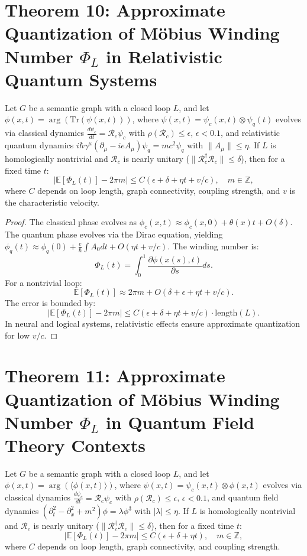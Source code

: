 \documentclass[12pt]{article}
\begin{document}
\section*{Theorem 10: Approximate Quantization of Möbius Winding Number \(\Phi_L\) in Relativistic Quantum Systems}
\begin{theorem}
Let \(G\) be a semantic graph with a closed loop \(L\), and let \(\phi(x,t) = \arg(\text{Tr}(\psi(x,t)))\), where \(\psi(x,t) = \psi_c(x,t) \otimes \psi_q(t)\) evolves via classical dynamics \(\frac{d\psi_c}{dt} = \mathcal{R}_c \psi_c\) with \(\rho(\mathcal{R}_c) \leq \epsilon\), \(\epsilon < 0.1\), and relativistic quantum dynamics \(i \hbar \gamma^\mu (\partial_\mu - ie A_\mu) \psi_q = m c^2 \psi_q\) with \(\|A_\mu\| \leq \eta\). If \(L\) is homologically nontrivial and \(\mathcal{R}_c\) is nearly unitary (\(\|\mathcal{R}_c^\dagger \mathcal{R}_c\| \leq \delta\)), then for a fixed time \(t\):
\[
\left| \mathbb{E}[\Phi_L(t)] - 2\pi m \right| \leq C (\epsilon + \delta + \eta t + v/c), \quad m \in \mathbb{Z},
\]
where \(C\) depends on loop length, graph connectivity, coupling strength, and \(v\) is the characteristic velocity.
\end{theorem}

\begin{proof}
The classical phase evolves as \(\phi_c(x,t) \approx \phi_c(x,0) + \theta(x)t + O(\delta)\). The quantum phase evolves via the Dirac equation, yielding \(\phi_q(t) \approx \phi_q(0) + \frac{e}{\hbar} \int A_0 dt + O(\eta t + v/c)\). The winding number is:
\[
\Phi_L(t) = \int_0^1 \frac{\partial \phi(x(s),t)}{\partial s} ds.
\]
For a nontrivial loop:
\[
\mathbb{E}[\Phi_L(t)] \approx 2\pi m + O(\delta + \epsilon + \eta t + v/c).
\]
The error is bounded by:
\[
\left| \mathbb{E}[\Phi_L(t)] - 2\pi m \right| \leq C (\epsilon + \delta + \eta t + v/c) \cdot \text{length}(L).
\]
In neural and logical systems, relativistic effects ensure approximate quantization for low \(v/c\).
\end{proof}
\section*{Theorem 11: Approximate Quantization of Möbius Winding Number \(\Phi_L\) in Quantum Field Theory Contexts}
\begin{theorem}
Let \(G\) be a semantic graph with a closed loop \(L\), and let \(\phi(x,t) = \arg(\langle \phi(x,t) \rangle)\), where \(\psi(x,t) = \psi_c(x,t) \otimes \phi(x,t)\) evolves via classical dynamics \(\frac{d\psi_c}{dt} = \mathcal{R}_c \psi_c\) with \(\rho(\mathcal{R}_c) \leq \epsilon\), \(\epsilon < 0.1\), and quantum field dynamics \(\left( \partial_t^2 - \partial_x^2 + m^2 \right) \phi = \lambda \phi^3\) with \(|\lambda| \leq \eta\). If \(L\) is homologically nontrivial and \(\mathcal{R}_c\) is nearly unitary (\(\|\mathcal{R}_c^\dagger \mathcal{R}_c\| \leq \delta\)), then for a fixed time \(t\):
\[
\left| \mathbb{E}[\Phi_L(t)] - 2\pi m \right| \leq C (\epsilon + \delta + \eta t), \quad m \in \mathbb{Z},
\]
where \(C\) depends on loop length, graph connectivity, and coupling strength.
\end{theorem}
\end{document}
